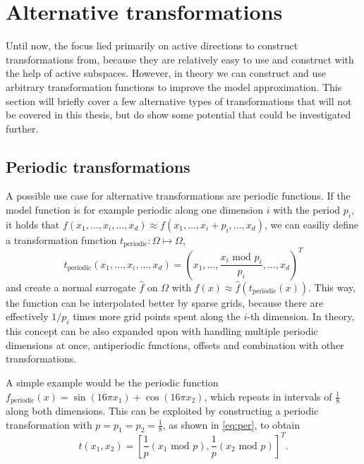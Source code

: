 \documentclass[
  a4paper,  %
  twoside,  %
  bibliography=totoc,
  headsepline,
  cleardoublepage=empty,
  parskip=half,
  draft=false
]{scrbook}
\begin{document}
\section{Alternative transformations}

Until now, the focus lied primarily on active directions to construct transformations from, because they are relatively easy to use and construct with the help of active subspaces.
However, in theory we can construct and use arbitrary transformation functions to improve the model approximation.
This section will briefly cover a few alternative types of transformations that will not be covered in this thesis, but do show some potential that could be investigated further.

\subsection{Periodic transformations}

A possible use case for alternative transformations are periodic functions.
If the model function is for example periodic along one dimension $i$ with the period $p_i$, \ie it holds that $f(x_1,\dots,x_i,\dots,x_d) \approx f(x_1,\dots,x_i + p_i, \dots,x_d)$, we can easiliy define a transformation function $t_{\text{periodic}} \colon \Omega \mapsto \Omega$,
\begin{equation}
t_{\text{periodic}}(x_1,\dots,x_i,\dots,x_d) = (x_1,\dots, \frac{x_i\text{ mod } p_i}{p_i}, \dots,x_d)^T
\label{eq:per}
\end{equation}
and create a normal surrogate $\hat{f}$ on $\Omega$ with $f(x) \approx \hat{f}(t_{\text{periodic}}(x))$.
This way, the function can be interpolated better by sparse grids, because there are effectively $1 / p_i$ times more grid points spent along the $i$-th dimension.
In theory, this concept can be also expanded upon with handling multiple periodic dimensions at once, antiperiodic functions, offsets and combination with other transformations.

A simple example would be the periodic function $f_{\text{periodic}}(x)=\sin(16\pi x_1)  + \cos(16\pi x_2)$, which repeats in intervals of $\frac{1}{8}$ along both dimensions.
This can be exploited by constructing a periodic transformation with $p=p_1=p_2=\frac{1}{8}$, as shown in \cref{eq:per}, to obtain
\begin{equation}
t(x_1,x_2) = \left[\frac{1}{p} \left(x_1 \text{ mod } p\right), \frac{1}{p} \left(x_2 \text{ mod } p\right)\right]^T.
\end{equation}
\end{document}
